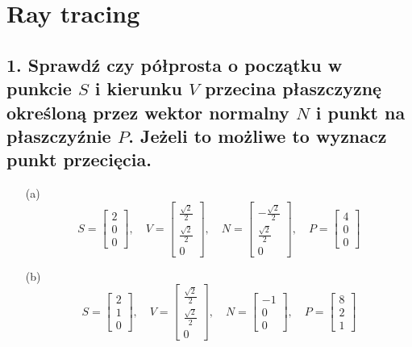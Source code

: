 \section*{Ray tracing}

\subsection*{1. Sprawdź czy półprosta o początku w punkcie \( S \) i kierunku \( V \) przecina płaszczyznę określoną przez wektor normalny \( N \) i punkt na płaszczyźnie \( P \). 
Jeżeli to możliwe to wyznacz punkt przecięcia.}

\begin{enumerate}
    \item[(a)] 
    \[
    S = \begin{bmatrix} 2 \\ 0 \\ 0 \end{bmatrix}, 
    \quad V = \begin{bmatrix} \frac{\sqrt{2}}{2} \\ \frac{\sqrt{2}}{2} \\ 0 \end{bmatrix}, 
    \quad N = \begin{bmatrix} -\frac{\sqrt{2}}{2} \\ \frac{\sqrt{2}}{2} \\ 0 \end{bmatrix}, 
    \quad P = \begin{bmatrix} 4 \\ 0 \\ 0 \end{bmatrix}
    \]

    \item[(b)] 
    \[
    S = \begin{bmatrix} 2 \\ 1 \\ 0 \end{bmatrix}, 
    \quad V = \begin{bmatrix} \frac{\sqrt{2}}{2} \\ \frac{\sqrt{2}}{2} \\ 0 \end{bmatrix}, 
    \quad N = \begin{bmatrix} -1 \\ 0 \\ 0 \end{bmatrix}, 
    \quad P = \begin{bmatrix} 8 \\ 2 \\ 1 \end{bmatrix}
    \]


\end{enumerate}
